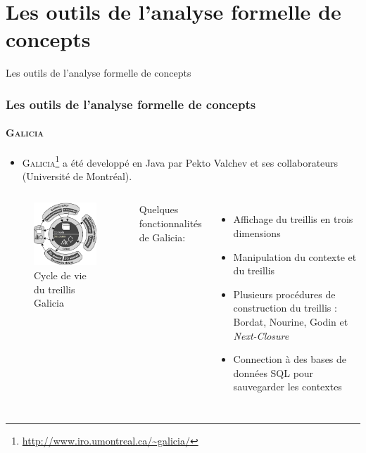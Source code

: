 \documentclass[french]{beamer}
\begin{document}
\section[Outils]{Les outils de l'analyse formelle de concepts}
\begin{frame}
\huge{\centerline{Les outils de l'analyse formelle de concepts}}
\end{frame}
\begin{frame}
\frametitle{Les outils de l'analyse formelle de concepts}
\framesubtitle{\textsc{Galicia}}
\begin{itemize}
\item \textsc{Galicia}\footnote{\url{http://www.iro.umontreal.ca/~galicia/}} a été developpé en Java par Pekto Valchev et ses collaborateurs (Université de Montréal).
\end{itemize}
\begin{columns}[c] %

\begin{figure}[H]
\begin{center}\includegraphics[scale=0.40]{figures/galicia-life-cycle.png}\end{center}
\caption{Cycle de vie du treillis Galicia}
\label{cap:fig:galicia-life-cycle}
\end{figure}

Quelques fonctionnalités de Galicia:
\begin{itemize}
\item Affichage du treillis en trois dimensions
\item Manipulation du contexte et du treillis
\item Plusieurs procédures de construction du treillis : Bordat, Nourine, Godin et \emph{Next-Closure}
\item Connection à des bases de données SQL pour sauvegarder les contextes
\end{itemize}
\end{columns}

\end{frame}
\end{document}
